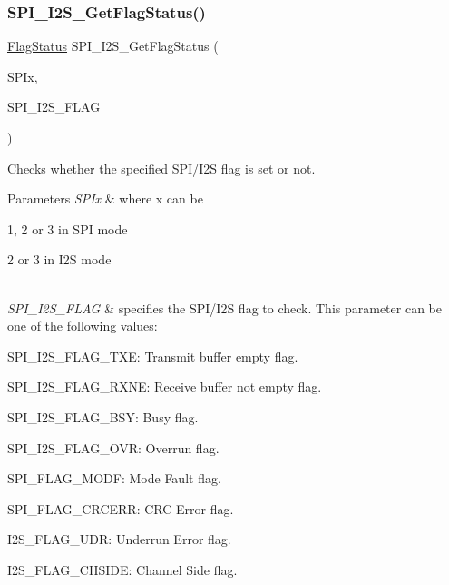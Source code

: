 \mbox{\label{group___s_p_i___private___functions_ga1bd785d129e09c5734a876c8f2767204}} 
\subsubsection{\texorpdfstring{S\+P\+I\+\_\+\+I2\+S\+\_\+\+Get\+Flag\+Status()}{SPI\_I2S\_GetFlagStatus()}}
{\footnotesize\ttfamily \hyperlink{group___exported__types_ga89136caac2e14c55151f527ac02daaff}{Flag\+Status} S\+P\+I\+\_\+\+I2\+S\+\_\+\+Get\+Flag\+Status (\begin{DoxyParamCaption}\item[{\hyperlink{struct_s_p_i___type_def}{S\+P\+I\+\_\+\+Type\+Def} $\ast$}]{S\+P\+Ix,  }\item[{uint16\+\_\+t}]{S\+P\+I\+\_\+\+I2\+S\+\_\+\+F\+L\+AG }\end{DoxyParamCaption})}



Checks whether the specified S\+P\+I/\+I2S flag is set or not. 


\begin{DoxyParams}{Parameters}
{\em S\+P\+Ix} & where x can be
\begin{DoxyItemize}
\item 1, 2 or 3 in S\+PI mode
\item 2 or 3 in I2S mode 
\end{DoxyItemize}\\
\hline
{\em S\+P\+I\+\_\+\+I2\+S\+\_\+\+F\+L\+AG} & specifies the S\+P\+I/\+I2S flag to check. This parameter can be one of the following values\+: \begin{DoxyItemize}
\item S\+P\+I\+\_\+\+I2\+S\+\_\+\+F\+L\+A\+G\+\_\+\+T\+XE\+: Transmit buffer empty flag. \item S\+P\+I\+\_\+\+I2\+S\+\_\+\+F\+L\+A\+G\+\_\+\+R\+X\+NE\+: Receive buffer not empty flag. \item S\+P\+I\+\_\+\+I2\+S\+\_\+\+F\+L\+A\+G\+\_\+\+B\+SY\+: Busy flag. \item S\+P\+I\+\_\+\+I2\+S\+\_\+\+F\+L\+A\+G\+\_\+\+O\+VR\+: Overrun flag. \item S\+P\+I\+\_\+\+F\+L\+A\+G\+\_\+\+M\+O\+DF\+: Mode Fault flag. \item S\+P\+I\+\_\+\+F\+L\+A\+G\+\_\+\+C\+R\+C\+E\+RR\+: C\+RC Error flag. \item I2\+S\+\_\+\+F\+L\+A\+G\+\_\+\+U\+DR\+: Underrun Error flag. \item I2\+S\+\_\+\+F\+L\+A\+G\+\_\+\+C\+H\+S\+I\+DE\+: Channel Side flag. \end{DoxyItemize}
\\
\hline
\end{DoxyParams}

